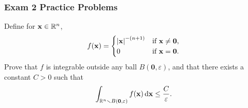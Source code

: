 \subsubsection{Exam 2 Practice Problems}
\setcounter{exercise}{0}

\begin{problem}
Define for $\mathbf{x}\in\mathbb{R}^n$,
\[
f(\mathbf{x})=
\begin{cases}
\left|\mathbf{x}\right|^{-(n+1)}&\text{if $\mathbf{x}\neq \mathbf{0}$,}\\
0&\text{if $\mathbf{x}=\mathbf{0}$.}
\end{cases}
\]
Prove that $f$ is integrable outside any ball $B(\mathbf{0},\varepsilon)$,
and that there exists a constant $C>0$ such that
\[
\int_{\mathbb{R}^n\smallsetminus B(\mathbf{0},\varepsilon)}f(\mathbf{x}) \mathop{}\!\mathrm{d} \mathbf{x}\leq\frac{C}{\varepsilon}.
\]
\end{problem}

